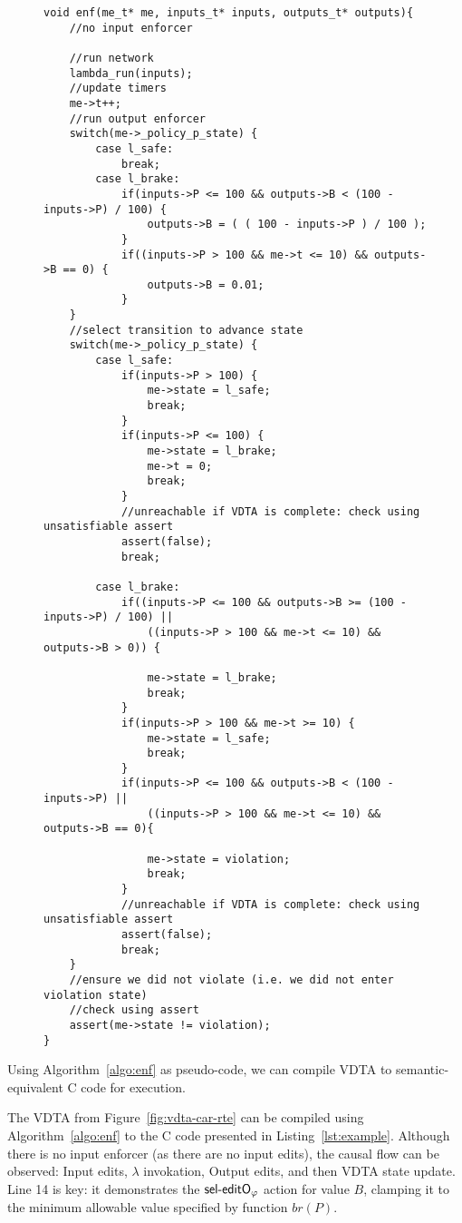 \begin{figure}[ht]
	\vspace{-5mm}
	\begin{lstlisting}[caption={Example compiled enforcer for VDTA in Figure~\ref{fig:vdta-car-rte}},label={lst:example}]
void enf(me_t* me, inputs_t* inputs, outputs_t* outputs){
	//no input enforcer
	
	//run network
	lambda_run(inputs);	
	//update timers
	me->t++;	
	//run output enforcer
	switch(me->_policy_p_state) {
		case l_safe:
			break;
		case l_brake:
			if(inputs->P <= 100 && outputs->B < (100 - inputs->P) / 100) {
				outputs->B = ( ( 100 - inputs->P ) / 100 );
			} 
			if((inputs->P > 100 && me->t <= 10) && outputs->B == 0) {
				outputs->B = 0.01;
			}	
	}
	//select transition to advance state
	switch(me->_policy_p_state) {
		case l_safe:
			if(inputs->P > 100) {
				me->state = l_safe;
				break;
			} 
			if(inputs->P <= 100) {
				me->state = l_brake;
				me->t = 0;
				break;
			} 
			//unreachable if VDTA is complete: check using unsatisfiable assert
			assert(false);
			break;
	
		case l_brake:
			if((inputs->P <= 100 && outputs->B >= (100 - inputs->P) / 100) || 
				((inputs->P > 100 && me->t <= 10) && outputs->B > 0)) {
				
				me->state = l_brake;
				break;
			} 
			if(inputs->P > 100 && me->t >= 10) {
				me->state = l_safe;
				break;
			} 
			if(inputs->P <= 100 && outputs->B < (100 - inputs->P) || 
				((inputs->P > 100 && me->t <= 10) && outputs->B == 0){
				
				me->state = violation;
				break;
			} 
			//unreachable if VDTA is complete: check using unsatisfiable assert
			assert(false);
			break;
	}
	//ensure we did not violate (i.e. we did not enter violation state)
	//check using assert
	assert(me->state != violation);
}\end{lstlisting}
\end{figure}



Using Algorithm~\ref{algo:enf} as pseudo-code, we can compile \ac{VDTA} to semantic-equivalent C code for execution.


\begin{example}
	The \ac{VDTA} from Figure~\ref{fig:vdta-car-rte} can be compiled using Algorithm~\ref{algo:enf} to the C code presented in Listing~\ref{lst:example}.
	Although there is no input enforcer (as there are no input edits), the causal flow can be observed: Input edits, $\lambda$ invokation, Output edits, and then \ac{VDTA} state update.
	Line 14 is key: it demonstrates the $\mathsf{{sel}\mbox{-} editO_{\varphi}}$ action for value $B$, clamping it to the minimum allowable value specified by function $br\left(P\right)$.
\end{example}

